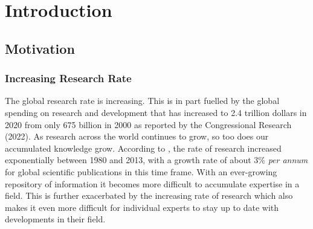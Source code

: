 \documentclass{l4proj}
\begin{document}
%
%
%
%
%
%
%
%
\chapter{Introduction}


\section{Motivation}

\subsection{Increasing Research Rate}

The global research rate is increasing. This is in part fuelled by the global spending on research and development that has increased to 2.4 trillion dollars in 2020 from only 675 billion in 2000 as reported by the Congressional Research \cite{congress} (2022). As research across the world continues to grow, so too does our accumulated knowledge grow. According to \cite{bornmann_growth_2015}, the rate of research increased exponentially between 1980 and 2013, with a growth rate of about 3\% \textit{per annum} for global scientific publications in this time frame. With an ever-growing repository of information it becomes more difficult to accumulate expertise in a field. This is further exacerbated by the increasing rate of research which also makes it even more difficult for individual experts to stay up to date with developments in their field. \\ 
\end{document}
